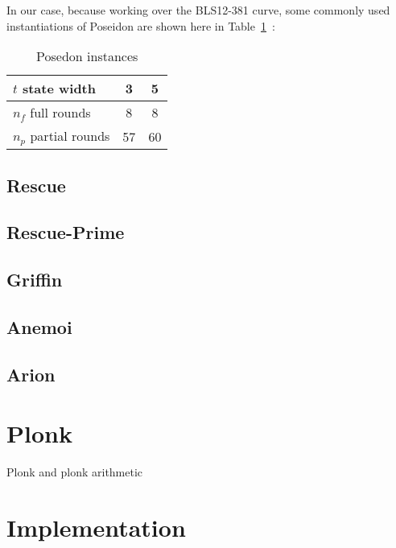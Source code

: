 \documentclass[12pt, a4paper]{report}
\begin{document}
In our case, because working over the BLS12-381 curve, some commonly used instantiations of Poseidon are shown here in Table~\ref{tab:poseidoninstances}~:
\begin{table}[H]
  \begin{center}
    \begin{tabular}{|l|c|c|}
      \hline
      $t$ state width & 3 & 5 \\
      \hline
      $n_f$ full rounds & 8 & 8 \\
      \hline
      $n_p$ partial rounds & 57 & 60 \\
      \hline
    \end{tabular}
  \end{center}
  \caption{Posedon instances}\label{tab:poseidoninstances}
\end{table}

\subsection{Rescue}\label{subsec:rescue}

\subsection{Rescue-Prime}\label{subsec:rescueprime}

\subsection{Griffin}\label{subsec:griffin}

\subsection{Anemoi}\label{subsec:anemoi}

\subsection{Arion}\label{subsec:arion}

\section{Plonk}

Plonk and plonk arithmetic

\section{Implementation}\label{sec:implementation}
\end{document}
